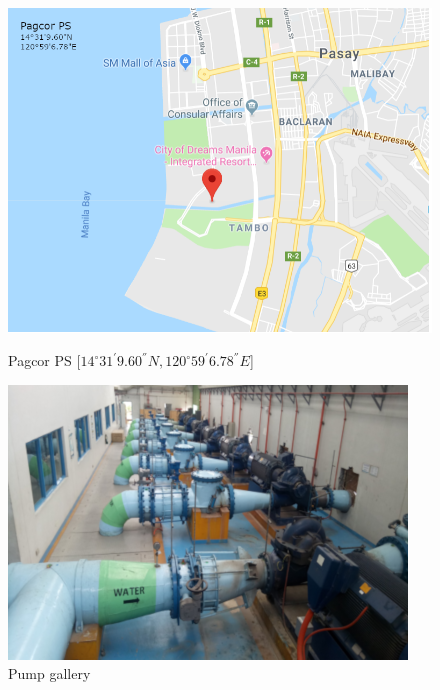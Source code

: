 \begin{figure}[!htb]
	\begin{minipage}[b]{0.5\linewidth}
		\centering
		\includegraphics[width=\textwidth]{figures/pagcorlocation}
		\caption{Pagcor PS [$14^{\circ}31^{'}9.60^{''}N, 120^{\circ}59^{'}6.78^{''}E$]}
		\label{pagcorlocation}
	\end{minipage}
	\hspace{0.05cm}
	\begin{minipage}[b]{0.5\linewidth}
		\centering
		\includegraphics[width=\textwidth]{figures/ch01_pumpgallery}
		\caption{Pump gallery}
		\label{ch01_pumpgallery}
	\end{minipage}
\end{figure}

